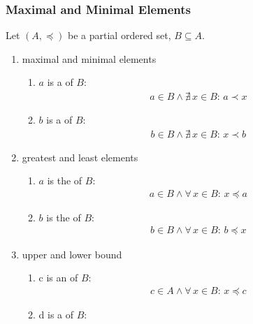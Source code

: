 \subsubsection{Maximal and Minimal Elements}
\begin{definition}
    Let $(A,\preceq)$ be a partial ordered set, $B\subseteq A$.
    \begin{enumerate}
        \item maximal and minimal elements
        \begin{enumerate}
            \item $a$ is a  of $B$: 
            \begin{align*}
                a\in B \land \nexists\, x\in B:\, a\prec x
            \end{align*}
            \item $b$ is a  of $B$: 
            \begin{align*}
                b\in B \land \nexists\, x\in B:\, x\prec b
            \end{align*}
        \end{enumerate}
        \item greatest and least elements
        \begin{enumerate}
            \item $a$ is the  of $B$: 
            \begin{align*}
                a\in B \land \forall\, x\in B:\, x\preceq a
            \end{align*}
            \item $b$ is the  of $B$: 
            \begin{align*}
                b\in B \land \forall\, x\in B:\, b\preceq x
            \end{align*}
        \end{enumerate}
        \item upper and lower bound
        \begin{enumerate}
            \item c is an  of $B$:
            \begin{align*}
                c\in A \land \forall\, x \in B:\, x\preceq c
            \end{align*}
            \item d is a  of $B$: 
            \begin{align*}

\end{align*}
\end{enumerate}
\end{enumerate}
\end{definition}
